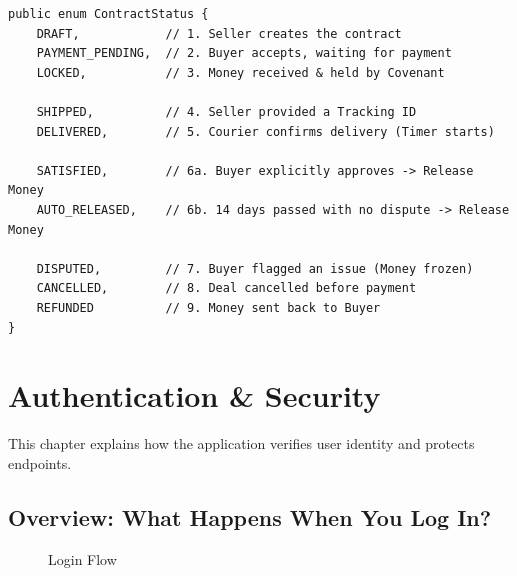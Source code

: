 \documentclass[11pt, a4paper]{article}
\begin{document}
\begin{lstlisting}[caption={ContractStatus.java}]
public enum ContractStatus {
    DRAFT,            // 1. Seller creates the contract
    PAYMENT_PENDING,  // 2. Buyer accepts, waiting for payment
    LOCKED,           // 3. Money received & held by Covenant

    SHIPPED,          // 4. Seller provided a Tracking ID
    DELIVERED,        // 5. Courier confirms delivery (Timer starts)

    SATISFIED,        // 6a. Buyer explicitly approves -> Release Money
    AUTO_RELEASED,    // 6b. 14 days passed with no dispute -> Release Money

    DISPUTED,         // 7. Buyer flagged an issue (Money frozen)
    CANCELLED,        // 8. Deal cancelled before payment
    REFUNDED          // 9. Money sent back to Buyer
}
\end{lstlisting}


\section{Authentication \& Security}

This chapter explains how the application verifies user identity and protects endpoints.

\subsection{Overview: What Happens When You Log In?}

\begin{figure}[H]
\centering
{}
\caption{Login Flow}
\end{figure}
\end{document}
